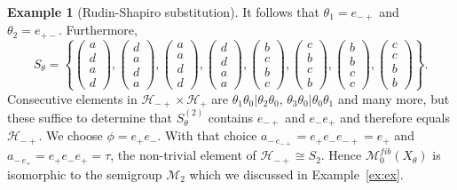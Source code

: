 \documentclass[12pt]{amsart}
\theoremstyle{definition}
\newtheorem{example}[theorem]{Example}
\numberwithin{equation}{section}
\newcommand{\Hh}{{\mathcal H}}
\newcommand{\M}{\mathcal M}
\newcommand{\Sfib}{\M^{fib}_0(X_\theta)}
\renewcommand{\a}{{\color{blue}\boxdot}}
\renewcommand{\c}{{\color{red}\boxminus}}
\renewcommand{\b}{{\color{orange}\boxplus}}
\begin{document}
\begin{example}[Rudin-Shapiro substitution]
It follows that $\theta_1 = e_{-+}$ and $\theta_2=e_{+-}$. Furthermore,
\[S_\theta = \left\{  \begin{pmatrix} a\\d\\a\\d \end{pmatrix}, \begin{pmatrix} d\\a\\d\\a \end{pmatrix},   \begin{pmatrix} a\\a\\d\\d \end{pmatrix},  \begin{pmatrix} d\\d\\a\\a \end{pmatrix}, \begin{pmatrix} 
b\\c\\b\\c \end{pmatrix}, \begin{pmatrix} 
c\\b\\c\\b \end{pmatrix},  \begin{pmatrix} b\\b\\c\\c \end{pmatrix},  \begin{pmatrix} c\\c\\b\\b \end{pmatrix}  \right\}.\]
Consecutive elements in $\Hh_{-+}\times \Hh_+$ are $\theta_1\theta_0|\theta_2\theta_0$, $\theta_3\theta_0|\theta_0\theta_1$ and many more, but these suffice to determine that
$S^{(2)}_\theta$ contains $e_{-+}$ and $e_-e_+$ and therefore equals $\Hh_{-+}$. We choose $\phi = e_+ e_-$. With that choice
$a_{-\,e_{-+}} = e_+ e_- e_{-+} = e_+$ and $a_{-\,e_{+}} = e_+ e_- e_{+} =\tau$, the non-trivial element of $\Hh_{-+}\cong S_2$. Hence $\Sfib$ is isomorphic to the semigroup $\mathcal M_2$ which we discussed in Example~\ref{ex:ex}.
\end{example}
\end{document}
